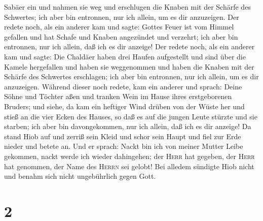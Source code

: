 Sabäer ein und nahmen sie weg und erschlugen die Knaben mit der Schärfe
des Schwertes; ich aber bin entronnen, nur ich allein, um es dir
anzuzeigen.  Der redete noch, als ein anderer kam und
sagte: Gottes Feuer ist vom Himmel gefallen und hat Schafe und Knaben
angezündet und verzehrt; ich aber bin entronnen, nur ich allein, daß ich
es dir anzeige!  Der redete noch, als ein anderer kam und
sagte: Die Chaldäer haben drei Haufen aufgestellt und sind über die
Kamele hergefallen und haben sie weggenommen und haben die Knaben mit
der Schärfe des Schwertes erschlagen; ich aber bin entronnen, nur ich
allein, um es dir anzuzeigen.  Während dieser noch
redete, kam ein anderer und sprach: Deine Söhne und Töchter aßen und
tranken Wein im Hause ihres erstgeborenen Bruders;  und
siehe, da kam ein heftiger Wind drüben von der Wüste her und stieß an
die vier Ecken des Hauses, so daß es auf die jungen Leute stürzte und
sie starben; ich aber bin davongekommen, nur ich allein, daß ich es dir
anzeige!  Da stand Hiob auf und zerriß sein Kleid und
schor sein Haupt und fiel zur Erde nieder und betete an. 
Und er sprach: Nackt bin ich von meiner Mutter Leibe gekommen, nackt
werde ich wieder dahingehen; der \textsc{Herr} hat gegeben, der
\textsc{Herr} hat genommen, der Name des \textsc{Herrn} sei gelobt!
 Bei alledem sündigte Hiob nicht und benahm sich nicht
ungebührlich gegen Gott.

\hypertarget{section-1}{%
\section{2}\label{section-1}}

